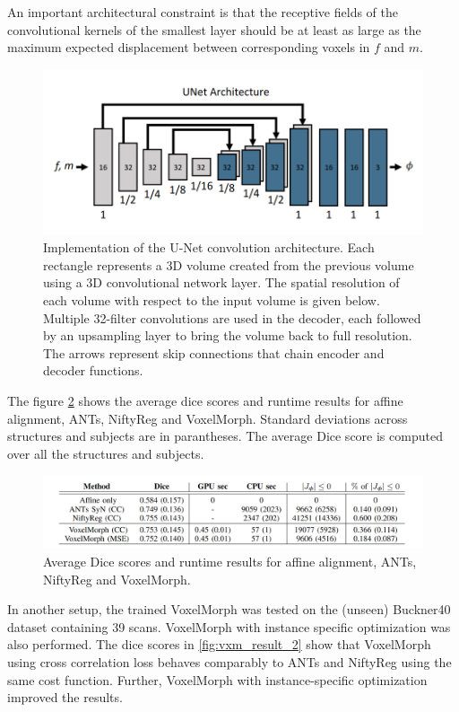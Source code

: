 \documentclass{report}
\begin{document}
	An important architectural constraint is that the receptive fields of the convolutional kernels of the smallest layer should be at least as large as the maximum expected displacement between corresponding voxels in $f$ and $m$.
	
	\begin{figure}[H]
		\centering
		\includegraphics[width=0.8\columnwidth]{resources/chapter2/vxm_unet.png}
		\caption{Implementation of the U-Net convolution architecture. Each rectangle represents a 3D volume created from the previous volume using a 3D convolutional network layer. The spatial resolution of each volume with respect to the input volume is given below. Multiple 32-filter convolutions are used in the decoder, each followed by an upsampling layer to bring the volume back to full resolution. The arrows represent skip connections that chain encoder and decoder functions. \cite{Balakrishnan_2019}}
		\label{fig:vxm_unet}
	\end{figure}
	
	The figure \ref{fig:vxm_result} shows the average dice scores and runtime results for affine alignment, ANTs, NiftyReg and VoxelMorph. Standard deviations across structures and subjects are in parantheses. The average Dice score is computed over all the structures and subjects.
	
	\begin{figure}[H]
		\centering
		\includegraphics[width=\columnwidth]{resources/chapter2/vxm_result.png}
		\caption{Average Dice scores and runtime results for affine alignment, ANTs, NiftyReg and VoxelMorph. \cite{Balakrishnan_2019}}
		\label{fig:vxm_result}
	\end{figure}
	
	In another setup, the trained VoxelMorph was tested on the (unseen) Buckner40 dataset containing 39 scans. VoxelMorph with instance specific optimization was also performed. The dice scores in \ref{fig:vxm_result_2} show that VoxelMorph using cross correlation loss behaves comparably to ANTs and NiftyReg using the same cost function. Further, VoxelMorph with instance-specific optimization improved the results.
	
\end{document}
